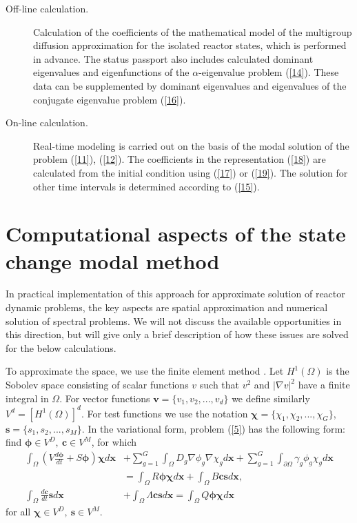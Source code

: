\documentclass[authoryear]{elsarticle}
\begin{document}
\begin{description}
 \item[Off-line calculation.] Calculation of the coefficients of the mathematical model of the multigroup diffusion approximation for the isolated reactor states, which is performed in advance. The status passport also includes calculated dominant eigenvalues and eigenfunctions of the  $\alpha$-eigenvalue problem (\ref{14}). 
These data can be supplemented by dominant eigenvalues and eigenvalues of the conjugate eigenvalue problem (\ref{16}).
 \item[On-line calculation.] Real-time modeling is carried out on the basis of the modal solution of the problem  (\ref{11}), (\ref{12}).
The coefficients in the representation  (\ref{18}) are calculated from the initial condition using (\ref{17})
or (\ref{19}). The solution for other time intervals is determined according to (\ref{15}).   
\end{description}  

\section{Computational aspects of the state change modal method} 

In practical implementation of this approach for approximate solution of reactor dynamic problems, the key aspects are spatial approximation and numerical solution of spectral problems. We will not discuss the available opportunities in this direction, but will give only a brief description of how these issues are solved for the below calculations. 

To approximate the space, we use the finite element method  \citep{brenner,quarteroni}. 
Let $H^1(\Omega)$ is the Sobolev space consisting of scalar functions $v$ such that  $v^2$ and  $\vert\nabla v\vert^2$ have a finite integral in  $\Omega$. For vector functions  $\bm v = \{v_1, v_2, ..., v_d\}$ we define similarly  $V^d = [H^1(\Omega)]^d$.  
For test functions we use the notation  $\bm \chi = \{\chi_1, \chi_2, ..., \chi_G\}$,
$\bm s = \{s_1, s_2, ..., s_M\}$. 
In the variational form, problem  (\ref{5}) has the following form: find $\bm \phi \in V^D, \ \bm c \in V^M$, for which
\begin{equation}\label{20}
\begin{split}
 \int_\Omega \left (V \frac{d \bm\phi}{d t} + S\bm \phi \right )\bm \chi  d\bm x 
 & + \sum_{g=1}^{G} \int_\Omega D_g\nabla \phi_g \nabla \chi_g  d\bm x 
 + \sum_{g=1}^{G} \int_{\partial \Omega} \gamma_g \phi_g \chi_g  d\bm x \\
 & = \int_\Omega R \bm \phi\bm \chi d\bm x + \int_\Omega B\bm c\bm s d\bm x, \\
 \int_\Omega \frac{d \bm{c}}{d t} \bm s d\bm x 
 &+ \int_\Omega \Lambda \bm{c} \bm s d\bm x = \int_\Omega Q \bm{\phi} \bm \chi d\bm x
\end{split}
\end{equation}
for all $\bm \chi  \in V^D, \ \bm s \in V^M$.
\end{document}
